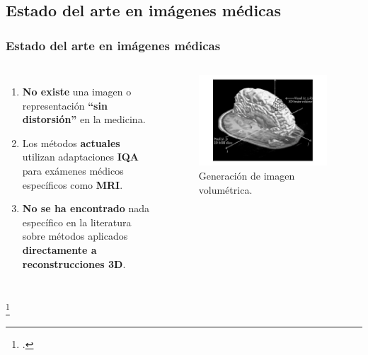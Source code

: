 \subsection{Estado del arte en imágenes médicas}
\begin{frame}
  \frametitle{Estado del arte en imágenes médicas}
  \vspace{-0.4cm}
  \begin{columns}
  \begin{enumerate}
    \item \textbf{No existe} una imagen o representación \textbf{``sin distorsión''} en la medicina.
    \item Los métodos \textbf{actuales} utilizan adaptaciones \textbf{IQA} para 
      exámenes médicos específicos como \textbf{MRI}.
    \item \textbf{No se ha encontrado} nada específico en la literatura sobre 
      métodos aplicados \textbf{directamente a reconstrucciones 3D}.
  \end{enumerate}
    \begin{figure}
      \begin{center}
        \includegraphics[width=0.95\textwidth]{imagenes/chapter2/MRIVoxel}
      \end{center}
      \caption{Generación de imagen volumétrica\footnotemark.}
      \label{fig:}
    \end{figure}
    
  \end{columns}
  \footcitetext{MRIVoxel}
\end{frame}

